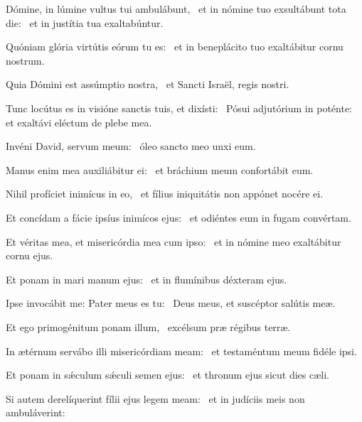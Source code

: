 \item Dómine, in lúmine vultus tui ambulábunt,~\pscross{} et in nómine tuo exsultábunt tota die:~\psstar{} et in justítia tua exaltabúntur.

\item Quóniam glória virtútis eórum tu es:~\psstar{} et in beneplácito tuo exaltábitur cornu nostrum.

\item Quia Dómini est assúmptio nostra,~\psstar{} et Sancti Israël, regis nostri.

\item Tunc locútus es in visióne sanctis tuis, et dixísti:~\pscross{} Pósui adjutórium in poténte:~\psstar{} et exaltávi eléctum de plebe mea.

\item Invéni David, servum meum:~\psstar{} óleo sancto meo unxi eum.

\item Manus enim mea auxiliábitur ei:~\psstar{} et bráchium meum confortábit eum.

\item Nihil profíciet inimícus in eo,~\psstar{} et fílius iniquitátis non appónet nocére ei.

\item Et concídam a fácie ipsíus inimícos ejus:~\psstar{} et odiéntes eum in fugam convértam.

\item Et véritas mea, et misericórdia mea cum ipso:~\psstar{} et in nómine meo exaltábitur cornu ejus.

\item Et ponam in mari manum ejus:~\psstar{} et in flumínibus déxteram ejus.

\item Ipse invocábit me: Pater meus es tu:~\psstar{} Deus meus, et suscéptor salútis meæ.

\item Et ego primogénitum ponam illum,~\psstar{} excélsum præ régibus terræ.

\item In ætérnum servábo illi misericórdiam meam:~\psstar{} et testaméntum meum fidéle ipsi.

\item Et ponam in sǽculum sǽculi semen ejus:~\psstar{} et thronum ejus sicut dies cæli.

\item Si autem derelíquerint fílii ejus legem meam:~\psstar{} et in judíciis meis non ambuláverint:

